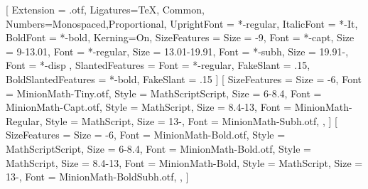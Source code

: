 
\setmainfont{MinionPro}[
  Extension = .otf,
  Ligatures={TeX, Common},
  Numbers={Monospaced,Proportional},
  UprightFont = *-regular,
  ItalicFont = *-It,
  BoldFont = *-bold,
  Kerning=On,
  SizeFeatures = {
    {Size = -9, Font = *-capt},
    {Size = 9-13.01, Font = *-regular},
    {Size = 13.01-19.91, Font = *-subh},
    {Size = 19.91-, Font = *-disp}
    },
  SlantedFeatures = {Font = *-regular, FakeSlant = .15},
  BoldSlantedFeatures = {*-bold, FakeSlant = .15}
]
[
  SizeFeatures = {
    {Size = -6, Font = MinionMath-Tiny.otf,
        Style = MathScriptScript},
    {Size = 6-8.4, Font = MinionMath-Capt.otf,
        Style = MathScript},
    {Size = 8.4-13, Font = MinionMath-Regular,
        Style = MathScript},
    {Size = 13-, Font = MinionMath-Subh.otf},
    },
]
[
  SizeFeatures = {
      {Size = -6, Font = MinionMath-Bold.otf,
          Style = MathScriptScript},
      {Size = 6-8.4, Font = MinionMath-Bold.otf,
          Style = MathScript},
      {Size = 8.4-13, Font = MinionMath-Bold,
          Style = MathScript},
      {Size = 13-, Font = MinionMath-BoldSubh.otf},
    },
]

\renewcommand\.{\mathchoice{\mkern2mu}{\mkern2mu}{\mkern1mu}{\mkern1mu}}

